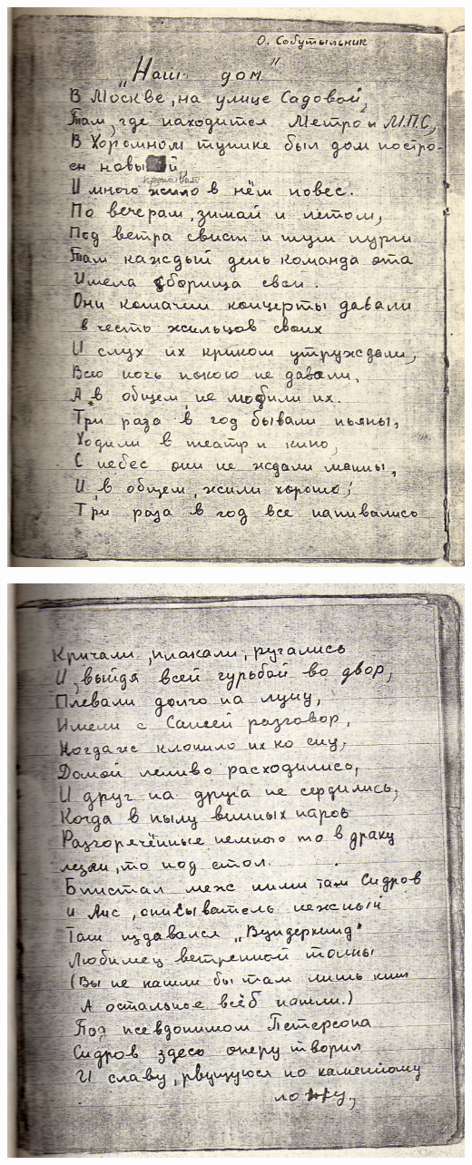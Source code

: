 \noindent
\includegraphics[width=\textwidth]{inc/Vynd/Vynd005}

\noindent
\includegraphics[width=\textwidth]{inc/Vynd/Vynd006}

